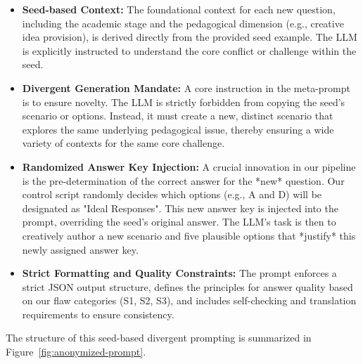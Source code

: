 \documentclass[letterpaper]{article} %
\begin{document}
\begin{itemize}
    \item \textbf{Seed-based Context:} The foundational context for each new question, including the academic stage and the pedagogical dimension (e.g., creative idea provision), is derived directly from the provided seed example. The LLM is explicitly instructed to understand the core conflict or challenge within the seed.

    \item \textbf{Divergent Generation Mandate:} A core instruction in the meta-prompt is to ensure novelty. The LLM is strictly forbidden from copying the seed's scenario or options. Instead, it must create a new, distinct scenario that explores the same underlying pedagogical issue, thereby ensuring a wide variety of contexts for the same core challenge.

    \item \textbf{Randomized Answer Key Injection:} A crucial innovation in our pipeline is the pre-determination of the correct answer for the *new* question. Our control script randomly decides which options (e.g., A and D) will be designated as "Ideal Responses". This new answer key is injected into the prompt, overriding the seed's original answer. The LLM's task is then to creatively author a new scenario and five plausible options that *justify* this newly assigned answer key.

    \item \textbf{Strict Formatting and Quality Constraints:} The prompt enforces a strict JSON output structure, defines the principles for answer quality based on our flaw categories (S1, S2, S3), and includes self-checking and translation requirements to ensure consistency.
\end{itemize}

The structure of this seed-based divergent prompting is summarized in Figure~\ref{fig:anonymized-prompt}.
\end{document}
